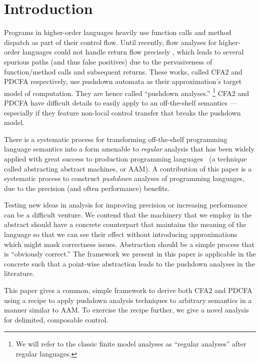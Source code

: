 \section{Introduction}

Programs in higher-order languages heavily use function calls and method dispatch as part of their control flow.
%
Until recently, flow analyses for higher-order languages could not handle return flow precisely \citep{ianjohnson:vardoulakis-lmcs11, ianjohnson:earl2010pdcfa}, which leads to several spurious paths (and thus false positives) due to the pervasiveness of function/method calls and subsequent returns.
%
These works, called CFA2 and PDCFA respectively, use pushdown automata as their approximation's target model of computation.
%
They are hence called ``pushdown analyses.''
%
\footnote{We will refer to the classic finite model analyses as ``regular analyses'' after regular languages.}
%
CFA2 and PDCFA have difficult details to easily apply to an off-the-shelf semantics --- especially if they feature non-local control transfer that breaks the pushdown model.

There is a systematic process for transforming off-the-shelf programming language semantics into a form amenable to \emph{regular} analysis that has been widely applied with great success to production programming languages~\citet{dvanhorn:VanHorn2010Abstracting} (a technique called abstracting abstract machines, or AAM).
%
A contribution of this paper is a systematic process to construct \emph{pushdown} analyses of programming languages, due to the precision (and often performance) benefits.

Testing new ideas in analysis for improving precision or increasing performance can be a difficult venture.
%
We contend that the machinery that we employ in the abstract should have a concrete counterpart that maintains the meaning of the language so that we can see their effect without introducing approximations which might mask correctness issues.
%
Abstraction should be a simple process that is ``obviously correct.''
%
The framework we present in this paper is applicable in the concrete such that a point-wise abstraction leads to the pushdown analyses in the literature.

This paper gives a common, simple framework to derive both CFA2 and PDCFA using a recipe to apply pushdown analysis techniques to arbitrary semantics in a manner similar to AAM.
%
To exercise the recipe further, we give a novel analysis for delimited, composable control. \\


